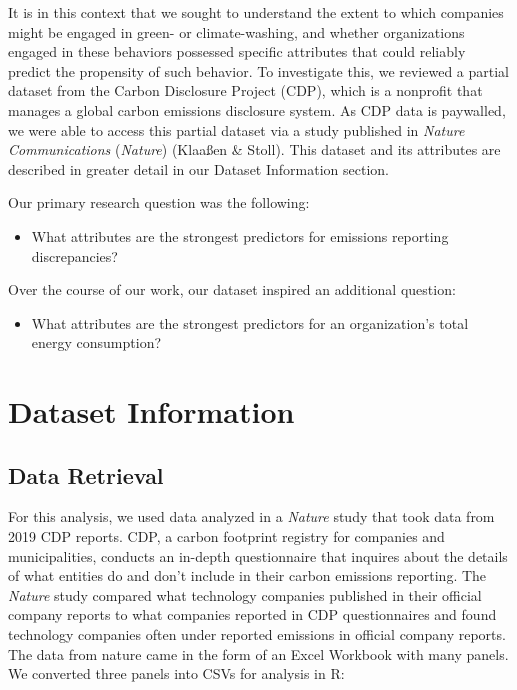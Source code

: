 \documentclass[
  12pt,
]{article}
\providecommand{\tightlist}{%
  \setlength{\itemsep}{0pt}\setlength{\parskip}{0pt}}
\begin{document}
It is in this context that we sought to understand the extent to which
companies might be engaged in green- or climate-washing, and whether
organizations engaged in these behaviors possessed specific attributes
that could reliably predict the propensity of such behavior. To
investigate this, we reviewed a partial dataset from the Carbon
Disclosure Project (CDP), which is a nonprofit that manages a global
carbon emissions disclosure system. As CDP data is paywalled, we were
able to access this partial dataset via a study published in
\emph{Nature Communications} (\emph{Nature}) (Klaaßen \& Stoll). This
dataset and its attributes are described in greater detail in our
Dataset Information section.

Our primary research question was the following:

\begin{itemize}
\tightlist
\item
  What attributes are the strongest predictors for emissions reporting
  discrepancies?
\end{itemize}

Over the course of our work, our dataset inspired an additional
question:

\begin{itemize}
\tightlist
\item
  What attributes are the strongest predictors for an organization's
  total energy consumption?
\end{itemize}

\newpage

\hypertarget{dataset-information}{%
\section{Dataset Information}\label{dataset-information}}

\hypertarget{data-retrieval}{%
\subsection{Data Retrieval}\label{data-retrieval}}

For this analysis, we used data analyzed in a \emph{Nature} study that
took data from 2019 CDP reports. CDP, a carbon footprint registry for
companies and municipalities, conducts an in-depth questionnaire that
inquires about the details of what entities do and don't include in
their carbon emissions reporting. The \emph{Nature} study compared what
technology companies published in their official company reports to what
companies reported in CDP questionnaires and found technology companies
often under reported emissions in official company reports. The data
from nature came in the form of an Excel Workbook with many panels. We
converted three panels into CSVs for analysis in R:
\end{document}

